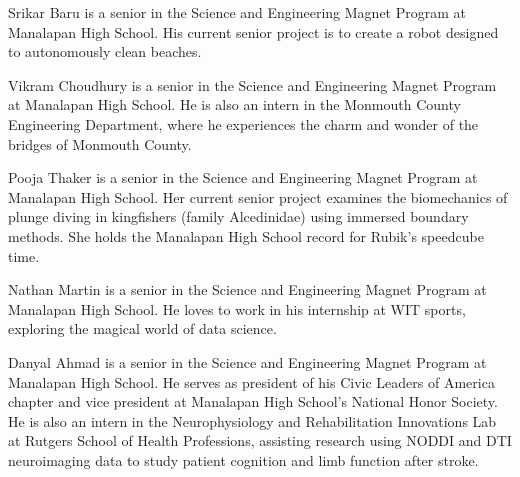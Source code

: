 ﻿\documentclass[10pt,journal,twoside]{IEEEtran}
\begin{document}
\begin{IEEEbiography}{Srikar Baru} is a senior in the Science and Engineering Magnet Program at Manalapan High School. His current senior project is to create a robot designed to autonomously clean beaches. 
\end{IEEEbiography}
\begin{IEEEbiography}{Vikram Choudhury} is a senior in the Science and Engineering Magnet Program at Manalapan High School. He is also an intern in the Monmouth County Engineering Department, where he experiences the charm and wonder of the bridges of Monmouth County. 
\end{IEEEbiography}
\vfill
\newpage
\begin{IEEEbiography}{Pooja Thaker} is a senior in the Science and Engineering Magnet Program at Manalapan High School. Her current senior project examines the biomechanics of plunge diving in kingfishers (family Alcedinidae) using immersed boundary methods. She holds the Manalapan High School record for  Rubik's speedcube time. 
\end{IEEEbiography}
\begin{IEEEbiography}{Nathan Martin} is a senior in the Science and Engineering Magnet Program at Manalapan High School. He loves to work in his internship at WIT sports, exploring the magical world of data science. 
\end{IEEEbiography}
\begin{IEEEbiography}{Danyal Ahmad} is a senior in the Science and Engineering Magnet Program at Manalapan High School. He serves as president of his Civic Leaders of America chapter and vice president at Manalapan High School's National Honor Society. He is also an intern in the Neurophysiology and Rehabilitation Innovations Lab at Rutgers School of Health Professions, assisting research using NODDI and DTI neuroimaging data to study patient cognition and limb function after stroke. 
\end{IEEEbiography}
\vfill
\end{document}
